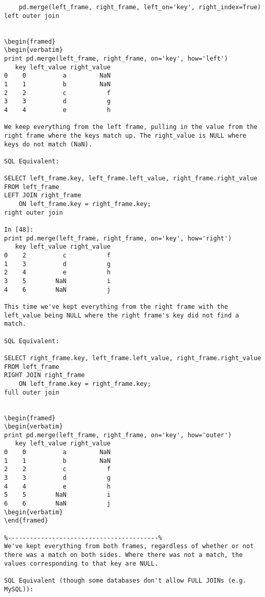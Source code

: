 \begin{framed}
\begin{verbatim}
    pd.merge(left_frame, right_frame, left_on='key', right_index=True)
left outer join


\begin{framed}
\begin{verbatim}
print pd.merge(left_frame, right_frame, on='key', how='left')
   key left_value right_value
0    0          a         NaN
1    1          b         NaN
2    2          c           f
3    3          d           g
4    4          e           h

We keep everything from the left frame, pulling in the value from the right frame where the keys match up. The right_value is NULL where keys do not match (NaN).

SQL Equivalent:

SELECT left_frame.key, left_frame.left_value, right_frame.right_value
FROM left_frame
LEFT JOIN right_frame
    ON left_frame.key = right_frame.key;
right outer join

In [48]:
print pd.merge(left_frame, right_frame, on='key', how='right')
   key left_value right_value
0    2          c           f
1    3          d           g
2    4          e           h
3    5        NaN           i
4    6        NaN           j

This time we've kept everything from the right frame with the left_value being NULL where the right frame's key did not find a match.

SQL Equivalent:

SELECT right_frame.key, left_frame.left_value, right_frame.right_value
FROM left_frame
RIGHT JOIN right_frame
    ON left_frame.key = right_frame.key;
full outer join


\begin{framed}
\begin{verbatim}
print pd.merge(left_frame, right_frame, on='key', how='outer')
   key left_value right_value
0    0          a         NaN
1    1          b         NaN
2    2          c           f
3    3          d           g
4    4          e           h
5    5        NaN           i
6    6        NaN           j
\begin{verbatim}
\end{framed}

%-----------------------------------------%
We've kept everything from both frames, regardless of whether or not there was a match on both sides. Where there was not a match, the values corresponding to that key are NULL.

SQL Equivalent (though some databases don't allow FULL JOINs (e.g. MySQL)):


\end{verbatim}
\end{framed}
